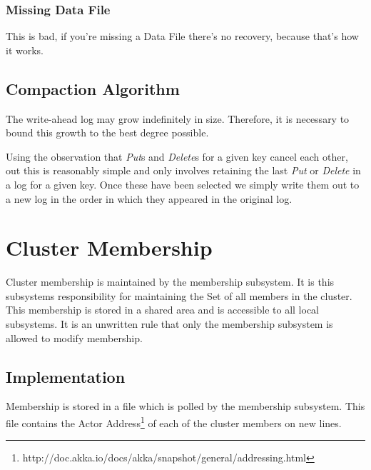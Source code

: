 \documentclass[11pt]{article}
\begin{document}
\subsubsection{Missing Data File}
This is bad, if you're missing a Data File there's no recovery, because that's how it works.

\subsection{Compaction Algorithm}
The write-ahead log may grow indefinitely in size. Therefore, it is necessary to bound this
growth to the best degree possible.

Using the observation that {\em Put}s and {\em Delete}s for a given key cancel each
other, out this is reasonably simple and only involves retaining the last {\em Put}
or {\em Delete} in a log for a given key. Once these have been selected we simply
write them out to a new log in the order in which they appeared in the original
log.

\section{Cluster Membership}
Cluster membership is maintained by the membership subsystem.  It is this subsystems responsibility for maintaining the Set of all members in the cluster.  This membership is stored in a shared area and is accessible to all local subsystems.  It is an unwritten rule that only the membership subsystem is allowed to modify membership.

\subsection{Implementation}
Membership is stored in a file which is polled by the membership subsystem. This file contains the Actor Address\footnote{http://doc.akka.io/docs/akka/snapshot/general/addressing.html} of each of the cluster members on new lines.
\end{document}
